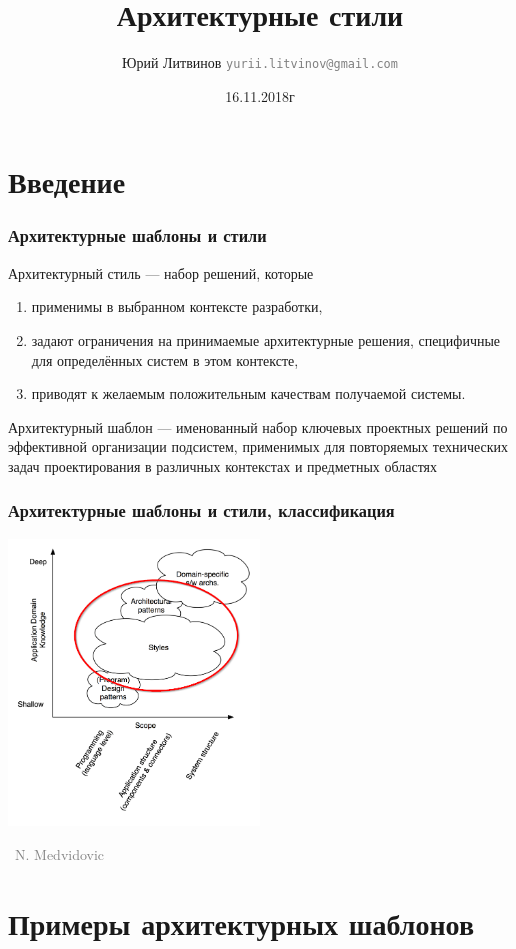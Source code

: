 \documentclass[xetex,mathserif,serif]{beamer}
\title{Архитектурные стили}
\author[Юрий Литвинов]{Юрий Литвинов \newline \textcolor{gray}{\small\texttt{yurii.litvinov@gmail.com}}}
\date{16.11.2018г}
\newcommand{\attribution}[1] {
	\vspace{-5mm}\begin{flushright}\begin{scriptsize}\textcolor{gray}{\textcopyright\, #1}\end{scriptsize}\end{flushright}
}
\begin{document}
	
	\frame{\titlepage}

	\section{Введение}

	\begin{frame}
		\frametitle{Архитектурные шаблоны и стили}
		Архитектурный стиль --- набор решений, которые
		\begin{enumerate}
			\item применимы в выбранном контексте разработки,
			\item задают ограничения на принимаемые архитектурные решения, специфичные для определённых систем в этом контексте,
			\item приводят к желаемым положительным качествам получаемой системы.
		\end{enumerate}
		Архитектурный шаблон --- именованный набор ключевых проектных решений по эффективной организации подсистем, применимых для повторяемых технических задач проектирования в различных контекстах и предметных областях
	\end{frame}

	\begin{frame}
		\frametitle{Архитектурные шаблоны и стили, классификация}
		\begin{center}
			\includegraphics[width=0.5\textwidth]{architecturalStylesHighlighted.png}
			\attribution{N. Medvidovic}
		\end{center}
	\end{frame}

	\section{Примеры архитектурных шаблонов}
\end{document}

